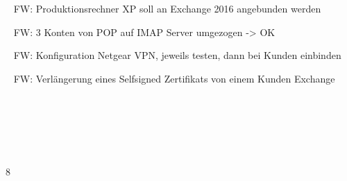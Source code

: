 {{	\textbullet~ FW: Produktionsrechner XP soll an Exchange 2016 angebunden werden\par
	\textbullet~ FW: 3 Konten von POP auf IMAP Server umgezogen -> OK\par
	\textbullet~ FW: Konfiguration Netgear VPN, jeweils testen, dann bei Kunden einbinden\par
	\textbullet~ FW: Verlängerung eines Selfsigned Zertifikats von einem Kunden Exchange\par
	\textbullet~ \par
	\textbullet~ \par
	\textbullet~ 
	}{}{8}
}{}
\Unterschrift
\newpage
